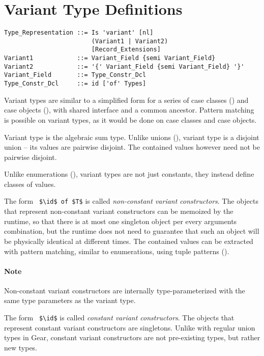 \section{Variant Type Definitions}
\label{sec:variant-types}

\syntax\begin{lstlisting}
Type_Representation ::= Is 'variant' [nl]
                        (Variant1 | Variant2)
                        [Record_Extensions]
Variant1            ::= Variant_Field {semi Variant_Field}
Variant2            ::= '{' Variant_Field {semi Variant_Field} '}'
Variant_Field       ::= Type_Constr_Dcl
Type_Constr_Dcl     ::= id ['of' Types]
\end{lstlisting}

Variant types are similar to a simplified form for a series of case classes () and case objects (), with shared interface and a common ancestor. Pattern matching is possible on variant types, as it would be done on case classes and case objects. 

Variant type is the algebraic sum type. Unlike unions (), variant type is a disjoint union -- its values are pairwise disjoint. The contained values however need not be pairwise disjoint. 

Unlike enumerations (), variant types are not just constants, they instead define classes of values. 

The form ~\lstinline!$\id$ of $T$! is called {\em non-constant variant constructors}. The objects that represent non-constant variant constructors can be memoized by the runtime, so that there is at most one singleton object per every arguments combination, but the runtime does not need to guarantee that such an object will be physically identical at different times. The contained values can be extracted with pattern matching, similar to enumerations, using tuple patterns (). 

\paragraph{Note}
Non-constant variant constructors are internally type-parameterized with the same type parameters as the variant type. 

The form ~\lstinline!$\id$! is called {\em constant variant constructors}. The objects that represent constant variant constructors are singletons. Unlike with regular union types in Gear, constant variant constructors are not pre-existing types, but rather new types. 

